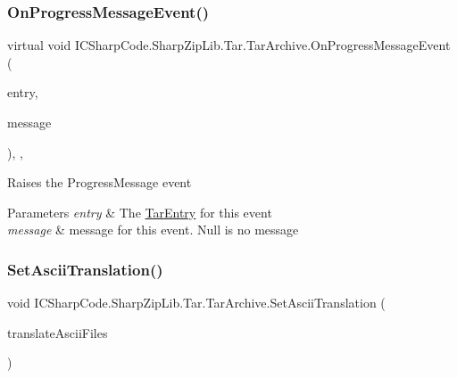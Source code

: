 \subsubsection{\texorpdfstring{On\+Progress\+Message\+Event()}{OnProgressMessageEvent()}}
{\footnotesize\ttfamily virtual void I\+C\+Sharp\+Code.\+Sharp\+Zip\+Lib.\+Tar.\+Tar\+Archive.\+On\+Progress\+Message\+Event (\begin{DoxyParamCaption}\item[{\hyperlink{class_i_c_sharp_code_1_1_sharp_zip_lib_1_1_tar_1_1_tar_entry}{Tar\+Entry}}]{entry,  }\item[{string}]{message }\end{DoxyParamCaption})\hspace{0.3cm}{\ttfamily [inline]}, {\ttfamily [protected]}, {\ttfamily [virtual]}}



Raises the Progress\+Message event 


\begin{DoxyParams}{Parameters}
{\em entry} & The \hyperlink{class_i_c_sharp_code_1_1_sharp_zip_lib_1_1_tar_1_1_tar_entry}{Tar\+Entry} for this event\\
\hline
{\em message} & message for this event. Null is no message\\
\hline
\end{DoxyParams}
\mbox{\label{class_i_c_sharp_code_1_1_sharp_zip_lib_1_1_tar_1_1_tar_archive_abc5d5a5ba64d880abced06346837fe62}} 
\subsubsection{\texorpdfstring{Set\+Ascii\+Translation()}{SetAsciiTranslation()}}
{\footnotesize\ttfamily void I\+C\+Sharp\+Code.\+Sharp\+Zip\+Lib.\+Tar.\+Tar\+Archive.\+Set\+Ascii\+Translation (\begin{DoxyParamCaption}\item[{bool}]{translate\+Ascii\+Files }\end{DoxyParamCaption})\hspace{0.3cm}{\ttfamily [inline]}}



